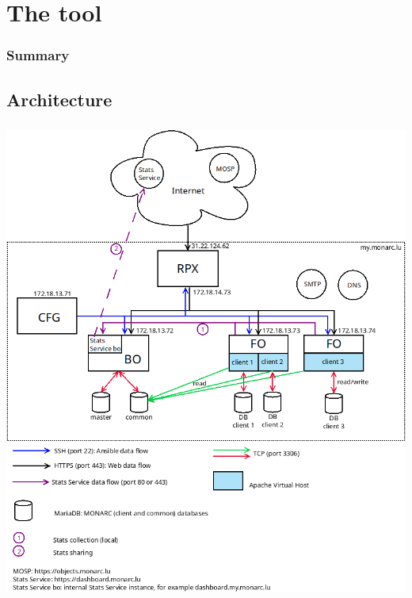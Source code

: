 %
%
\section{The tool}
\begin{frame}
  \frametitle{Summary}
\end{frame}
\subsection{Architecture}
\begin{frame}
  \frametitle{}
  \framesubtitle{}
  \begin{center}
    \includegraphics[scale=0.26]{pictures/monarc-architecture.png}
  \end{center}
\end{frame}



